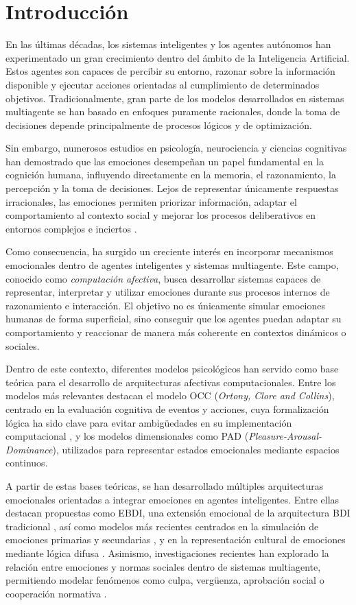 \section{Introducción}

En las últimas décadas, los sistemas inteligentes y los agentes autónomos han experimentado un gran crecimiento dentro del ámbito de la Inteligencia Artificial. Estos agentes son capaces de percibir su entorno, razonar sobre la información disponible y ejecutar acciones orientadas al cumplimiento de determinados objetivos. Tradicionalmente, gran parte de los modelos desarrollados en sistemas multiagente se han basado en enfoques puramente racionales, donde la toma de decisiones depende principalmente de procesos lógicos y de optimización.

Sin embargo, numerosos estudios en psicología, neurociencia y ciencias cognitivas han demostrado que las emociones desempeñan un papel fundamental en la cognición humana, influyendo directamente en la memoria, el razonamiento, la percepción y la toma de decisiones. Lejos de representar únicamente respuestas irracionales, las emociones permiten priorizar información, adaptar el comportamiento al contexto social y mejorar los procesos deliberativos en entornos complejos e inciertos \cite{alfonso2021affect}.

Como consecuencia, ha surgido un creciente interés en incorporar mecanismos emocionales dentro de agentes inteligentes y sistemas multiagente. Este campo, conocido como \textit{computación afectiva}, busca desarrollar sistemas capaces de representar, interpretar y utilizar emociones durante sus procesos internos de razonamiento e interacción. El objetivo no es únicamente simular emociones humanas de forma superficial, sino conseguir que los agentes puedan adaptar su comportamiento y reaccionar de manera más coherente en contextos dinámicos o sociales.

Dentro de este contexto, diferentes modelos psicológicos han servido como base teórica para el desarrollo de arquitecturas afectivas computacionales. Entre los modelos más relevantes destacan el modelo OCC (\textit{Ortony, Clore and Collins}), centrado en la evaluación cognitiva de eventos y acciones, cuya formalización lógica ha sido clave para evitar ambigüedades en su implementación computacional \cite{occ2009revisited}, y los modelos dimensionales como PAD (\textit{Pleasure-Arousal-Dominance}), utilizados para representar estados emocionales mediante espacios continuos.

A partir de estas bases teóricas, se han desarrollado múltiples arquitecturas emocionales orientadas a integrar emociones en agentes inteligentes. Entre ellas destacan propuestas como EBDI, una extensión emocional de la arquitectura BDI tradicional \cite{jiang2007ebdi}, así como modelos más recientes centrados en la simulación de emociones primarias y secundarias \cite{becker2009wasabi}, y en la representación cultural de emociones mediante lógica difusa \cite{taverner2021fuzzy,taverner2023multidimensional}. Asimismo, investigaciones recientes han explorado la relación entre emociones y normas sociales dentro de sistemas multiagente, permitiendo modelar fenómenos como culpa, vergüenza, aprobación social o cooperación normativa \cite{argente2022normative}.

